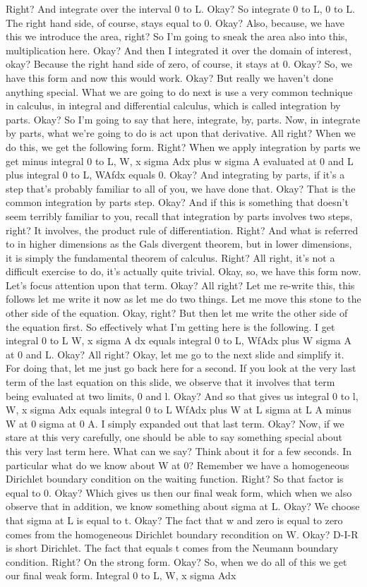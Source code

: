 \documentclass[10pt]{article}
\begin{document}
Right? And integrate over the interval 0 to L. Okay? So integrate 0 to L, 0 to L. The right hand side, of course, stays equal to 0. Okay? Also, because, we have this we introduce the area, right? So I'm going to sneak the area also into this, multiplication here. Okay? And then I integrated it over the domain of interest, okay? Because the right hand side of zero, of course, it stays at 0. Okay? So, we have this form and now this would work. Okay? But really we haven't done anything special. What we are going to do next is use a very common technique in calculus, in integral and differential calculus, which is called integration by parts. Okay? So I'm going to say that here, integrate, by, parts. Now, in integrate by parts, what we're going to do is act upon that derivative. All right? When we do this, we get the following form. Right? When we apply integration by parts we get minus integral 0 to L, W, x sigma Adx plus w sigma A evaluated at 0 and L plus integral 0 to L, WAfdx equals 0. Okay? And integrating by parts, if it's a step that's probably familiar to all of you, we have done that. Okay? That is the common integration by parts step. Okay? And if this is something that doesn't seem terribly familiar to you, recall that integration by parts involves two steps, right? It involves, the product rule of differentiation. Right? And what is referred to in higher dimensions as the Gals divergent theorem, but in lower dimensions, it is simply the fundamental theorem of calculus. Right? All right, it's not a difficult exercise to do, it's actually quite trivial. Okay, so, we have this form now. Let's focus attention upon that term. Okay? All right? Let me re-write this, this follows let me write it now as let me do two things. Let me move this stone to the other side of the equation. Okay, right? But then let me write the other side of the equation first. So effectively what I'm getting here is the following. I get integral 0 to L W, x sigma A dx equals integral 0 to L, WfAdx plus W sigma A at 0 and L. Okay? All right? Okay, let me go to the next slide and simplify it. For doing that, let me just go back here for a second. If you look at the very last term of the last equation on this slide, we observe that it involves that term being evaluated at two limits, 0 and l. Okay? And so that gives us integral 0 to l, W, x sigma Adx equals integral 0 to L WfAdx plus W at L sigma at L A minus W at 0 sigma at 0 A. I simply expanded out that last term. Okay? Now, if we stare at this very carefully, one should be able to say something special about this very last term here. What can we say? Think about it for a few seconds. In particular what do we know about W at 0? Remember we have a homogeneous Dirichlet boundary condition on the waiting function. Right? So that factor is equal to 0. Okay? Which gives us then our final weak form, which when we also observe that in addition, we know something about sigma at L. Okay? We choose that sigma at L is equal to t. Okay? The fact that w and zero is equal to zero comes from the homogeneous Dirichlet boundary recondition on W. Okay? D-I-R is short Dirichlet. The fact that equals t comes from the Neumann boundary condition. Right? On the strong form. Okay? So, when we do all of this we get our final weak form. Integral 0 to L, W, x sigma Adx 
\end{document}
